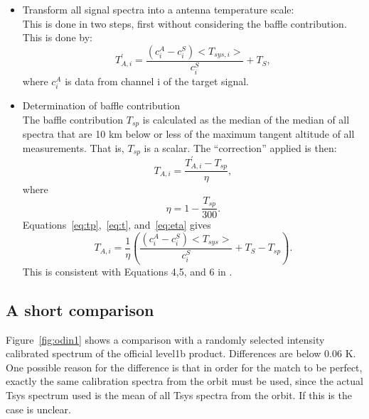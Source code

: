 \documentclass[12pt]{article}
\begin{document}
\begin{itemize}
\item Transform all signal spectra into a antenna temperature 
scale:\\
This is done in two steps, first without considering the baffle
contribution.
This is done by:
\begin{equation}
T^{'}_{A,i}=\frac{(c^{A}_{i}-c^{S}_{i})<T_{sys,i}>}{c^{S}_{i}}+T_{S},
\label{eq:tp}
\end{equation}
where \(c^{A}_{i}\) is data from channel i of the target signal. 

\item Determination of baffle contribution\\
The baffle contribution \(T_{sp}\) is calculated as the 
median of the median of all spectra that are 10 km below or 
less of the maximum tangent altitude of all measurements.
That is, \(T_{sp}\) is a scalar. 
The ``correction'' applied is then:
\begin{equation}
T_{A,i}=\frac{T^{'}_{A,i}-T_{sp}}{\eta},
\label{eq:t}
\end{equation}
where 
\begin{equation}
\eta=1-\frac{T_{sp}}{300}.
\label{eq:eta}
\end{equation}
Equations~\ref{eq:tp},~\ref{eq:t}, and~\ref{eq:eta}  gives
\begin{equation}
T_{A,i}=\frac{1}{\eta}\left(\frac{(c^{A}_{i}-c^{S}_{i})<T_{sys}>}{c_{i}^{S}}+T_{S}-T_{sp}\right).
\end{equation}
This is consistent with Equations 4,5, and 6 in \cite{notes}. 
\end{itemize}

\subsection{A short comparison} 
Figure~\ref{fig:odin1} shows a comparison with a randomly 
selected intensity calibrated spectrum of the official
level1b product. Differences are below 0.06 K.
One possible reason for the difference is that in order
for the match to be perfect, exactly the same calibration spectra 
from the orbit must be used,
since the actual Tsys spectrum used is the mean of all
Tsys spectra from the orbit. If this is the case is unclear.
    
\end{document}
